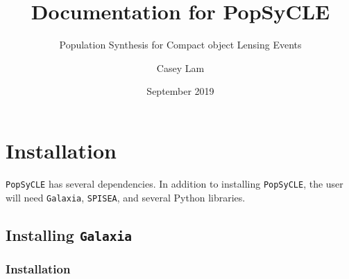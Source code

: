 \documentclass{scrartcl}
\title{Documentation for PopSyCLE}
\subtitle{Population Synthesis for Compact object Lensing Events}
\author{Casey Lam}
\date{September 2019}
\begin{document}
\maketitle

\newpage

\tableofcontents

\newpage
\section{Installation}

\texttt{PopSyCLE} has several dependencies.
In addition to installing \texttt{PopSyCLE}, the user will need \texttt{Galaxia}, \texttt{SPISEA}, and several Python libraries.

\subsection{Installing \texttt{Galaxia}}

\subsubsection{Installation}
\end{document}
